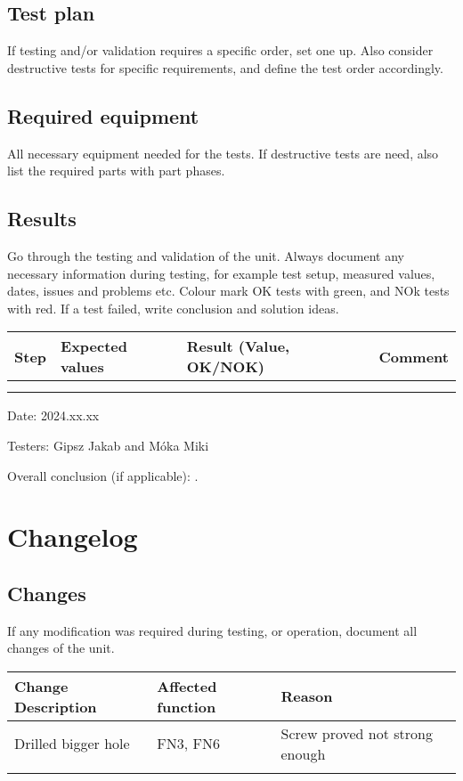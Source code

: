 \documentclass[12pt,a4paper]{article}
\begin{document}
		\subsection*{Test plan}
			If testing and/or validation requires a specific order, set one up. Also consider destructive tests for specific requirements, and define the test order accordingly.
		\subsection*{Required equipment}
			All necessary equipment needed for the tests. If destructive tests are need, also list the required parts with part phases.
		\subsection*{Results}
			Go through the testing and validation of the unit. Always document any necessary information during testing, for example test setup, measured values, dates, issues and problems etc. Colour mark OK tests with green, and NOk tests with red. If a test failed, write conclusion and solution ideas.
			\begin{table}[H]
				\centering
				\begin{tabular}{|l|l|l|l|}
					\hline
					\textbf{Step}& \textbf{Expected values} & \textbf{Result (Value, OK/NOK)}&\textbf{Comment}\\
					\hline
					&  & & \\
					\hline
					&  & & \\
					\hline				
				\end{tabular}
			\end{table}
			Date: 2024.xx.xx
			
			Testers: Gipsz Jakab and Móka Miki
			
			Overall conclusion (if applicable): .
			
	\section*{Changelog}
		\subsection*{Changes}
			If any modification was required during testing, or operation, document all changes of the unit.
		\begin{table}[H]
			\centering
			\begin{tabular}{|l|l|l|}
				\hline
				\textbf{Change Description}& \textbf{Affected function} & \textbf{Reason} \\
				\hline
				Drilled bigger hole& FN3, FN6 & Screw proved not strong enough \\
				\hline
				&  &  \\
				\hline
			\end{tabular}
		\end{table}
\end{document}
